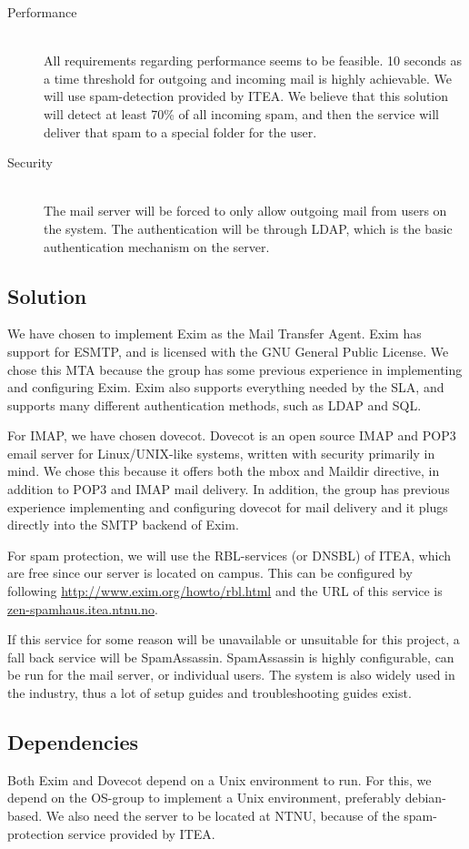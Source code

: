 \documentclass[12pt]{article}
\begin{document}
\begin{description}
\item[Performance] \hfill \\
All requirements regarding performance seems to be feasible. 10 seconds
as a time threshold for outgoing and incoming mail is highly achievable.
We will use spam-detection provided by ITEA. We believe that this
solution will detect at least 70\% of all incoming spam, and then the
service will deliver that spam to a special folder for the user.

\item[Security] \hfill \\
The mail server will be forced to only allow outgoing mail from users on
the system. The authentication will be through LDAP, which is the basic
authentication mechanism on the server.

\end{description}
\subsection{Solution}

We have chosen to implement Exim\cite{exim} as the Mail Transfer Agent. Exim has
support for ESMTP, and is licensed with the GNU General Public
License\cite{gnu-license}. We chose this MTA because the group has some previous
experience in implementing and configuring Exim. Exim also supports
everything needed by the SLA, and supports many different authentication
methods, such as LDAP and SQL. 

For IMAP, we have chosen dovecot. Dovecot is an open source IMAP and
POP3 email server for Linux/UNIX-like systems, written with security
primarily in mind\cite{dovecot}. We chose this because it offers both the mbox and
Maildir directive, in addition to POP3 and IMAP mail delivery. In
addition, the group has previous experience implementing and configuring
dovecot for mail delivery and it plugs directly into the SMTP backend
of Exim.

For spam protection, we will use the RBL-services (or DNSBL) of ITEA,
which are free since our server is located on campus. This can be
configured by following \url{http://www.exim.org/howto/rbl.html} and the URL
of this service is \url{zen-spamhaus.itea.ntnu.no}.

If this service for some reason will be unavailable or unsuitable for
this project, a fall back service will be
SpamAssassin\cite{spamassassin}. SpamAssassin is highly configurable,
can be run for the mail server, or individual users. The system is also
widely used in the industry, thus a lot of setup guides and
troubleshooting guides exist.

\subsection{Dependencies}
Both Exim and Dovecot depend on a Unix environment to run. For this, we
depend on the OS-group to implement a Unix environment, preferably
debian-based.
We also need the server to be located at NTNU, because of the
spam-protection service provided by ITEA. 

\newpage


\end{document}

